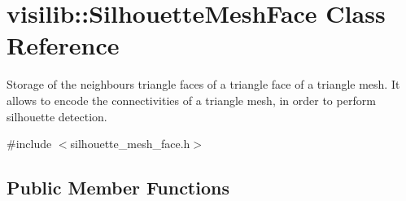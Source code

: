 \hypertarget{classvisilib_1_1_silhouette_mesh_face}{}\section{visilib\+::Silhouette\+Mesh\+Face Class Reference}
\label{classvisilib_1_1_silhouette_mesh_face}


Storage of the neighbours triangle faces of a triangle face of a triangle mesh. It allows to encode the connectivities of a triangle mesh, in order to perform silhouette detection.  




{\ttfamily \#include $<$silhouette\+\_\+mesh\+\_\+face.\+h$>$}

\subsection*{Public Member Functions}
